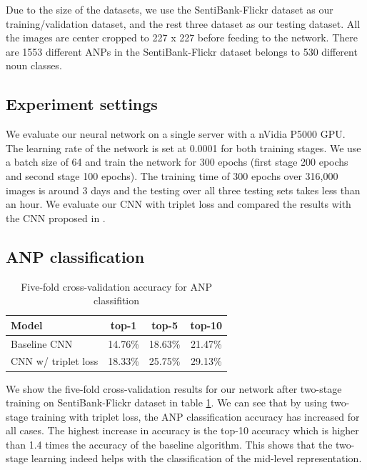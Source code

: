 Due to the size of the datasets, we use the SentiBank-Flickr dataset as our training/validation dataset, and the rest three dataset as our testing dataset. All the images are center cropped to 227 x 227 before feeding to the network. There are 1553 different ANPs in the SentiBank-Flickr dataset belongs to 530 different noun classes. 


\subsection{Experiment settings}
\label{eval_system}

We evaluate our neural network on a single server with a nVidia P5000 GPU. The learning rate of the network is set at 0.0001 for both training stages. We use a batch size of 64 and train the network for 300 epochs (first stage 200 epochs and second stage 100 epochs). The training time of 300 epochs over 316,000 images is around 3 days and the testing over all three testing sets takes less than an hour. We evaluate our CNN with triplet loss and compared the results with the CNN proposed in \cite{campos2017pixels}.

\subsection{ANP classification}
\label{eval_anp_accuracy}

\begin{table}[h]
		\caption{Five-fold cross-validation accuracy for ANP classifition}
		\label{table:anp_accuracy}
		\centering
		\begin{tabular}{l|ccc} \hline
			Model & top-1 & top-5 & top-10 \\ \hline
			Baseline CNN \cite{chen2014deepsentibank} & 14.76\% & 18.63\% & 21.47\% \\ 
			CNN w/ triplet loss & 18.33\% & 25.75\% & 29.13\%  \\ \hline
		\end{tabular}
\end{table}

We show the five-fold cross-validation results for our network after two-stage training on SentiBank-Flickr dataset in table \ref{table:anp_accuracy}. We can see that by using two-stage training with triplet loss, the ANP classification accuracy has increased for all cases. The highest increase in accuracy is the top-10 accuracy which is higher than 1.4 times the accuracy of the baseline algorithm. This shows that the two-stage learning indeed helps with the classification of the mid-level representation.

